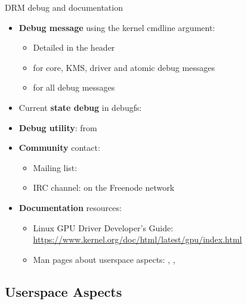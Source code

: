 \begin{frame}[fragile]{DRM debug and documentation}
  \begin{itemize}
  \item \textbf{Debug message} using the  kernel cmdline argument:
    \begin{itemize}
    \item Detailed in the  header
    \item {} for core, KMS, driver and atomic debug messages
    \item {} for all debug messages
    \end{itemize}
  \item Current \textbf{state debug} in debugfs:\\
  \item \textbf{Debug utility}:  from 
  \item \textbf{Community} contact:
    \begin{itemize}
    \item Mailing list: 
    \item IRC channel:  on the Freenode network
    \end{itemize}
  \item \textbf{Documentation} resources:
    \begin{itemize}
    \item Linux GPU Driver Developer’s Guide: \url{https://www.kernel.org/doc/html/latest/gpu/index.html}
    \item Man pages about userspace aspects: , , 
    \end{itemize}
  \end{itemize}
\end{frame}


\subsection{Userspace Aspects}
